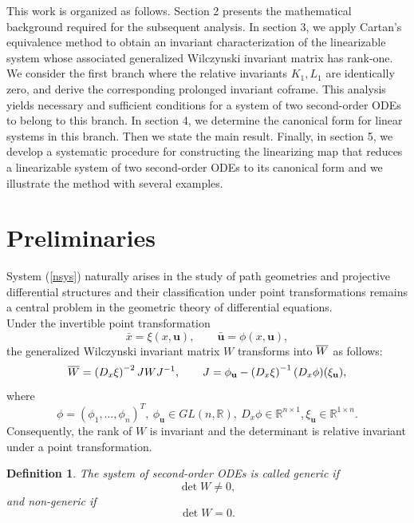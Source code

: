 \documentclass[12pt]{article}
\newtheorem{definition}[theorem]{Definition}
\begin{document}
This work is organized as follows. Section 2 presents the mathematical background required for the subsequent analysis. In section 3, we apply Cartan's equivalence method to obtain an invariant characterization of the linearizable system whose associated generalized Wilczynski invariant matrix has rank-one. We consider the first branch where the relative invariants $K_1,L_1$ are identically zero, and derive the corresponding prolonged invariant coframe. This analysis yields necessary and sufficient conditions for a system of two second-order ODEs to belong to this branch. In section 4, we determine the canonical form for linear systems in this branch. Then we state the main result. Finally, in section 5, we develop a systematic procedure for constructing the linearizing map that reduces a linearizable system of two 
second-order ODEs to its canonical form and we illustrate the method with several examples.


\section{Preliminaries}
System (\ref{nsys}) naturally arises in the study of path geometries and projective differential structures and their classification under point transformations remains a central problem in the geometric theory of differential equations.\\

Under the invertible point transformation
\begin{equation}
\bar{x}=\xi(x,\mathbf{u}),\qquad 
\bar{\mathbf{u}}=\phi(x,\mathbf{u}),
\end{equation}
the generalized Wilczynski invariant matrix $W$ transforms into $\overline{\vphantom{x}W}$ as follows:
\begin{equation}
\overline{\vphantom{x}W}
=
\left(D_x \xi\right)^{-2} J W J^{-1},
\qquad
J=\phi_{\mathbf{u}}-\left(D_x \xi\right)^{-1}(D_x \phi)(\xi_{\mathbf{u}}),
\end{equation}
 where $$\phi=(\phi_1,\ldots,\phi_n)^T,~\phi_{\mathbf{u}}
\in GL(n,\mathbb{R}),~D_x \phi\in \mathbb{R}^{n\times1}, \xi_{\mathbf{u}}
\in \mathbb{R}^{1\times n} .$$
Consequently, the rank  of $W$ is invariant and the determinant is relative invariant under a point transformation. 
\begin{definition}
The system of second-order ODEs is called \emph{generic} if
\begin{equation}
\det W \neq 0,
\end{equation}
and \emph{non-generic} if
\begin{equation}
\det W = 0.
\end{equation}
\end{definition}
\end{document}
